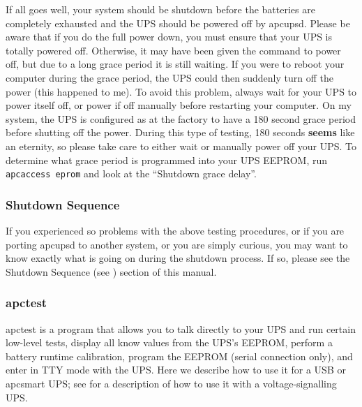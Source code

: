{{{{If all goes well, your system should be shutdown before the batteries are
completely exhausted and the UPS should be powered off by apcupsd. Please be
aware that if you do the full power down, you must ensure that your UPS is
totally powered off.  Otherwise, it may have been given the command to power
off, but due to a long grace period it is still waiting. If you were to reboot
your computer during the grace period, the UPS could then suddenly turn off
the power (this happened to me). To avoid this problem, always wait for your
UPS to power itself off, or power if off manually before restarting your
computer. On my system, the UPS is configured as at the factory to have a 180
second grace period before shutting off the power. During this type of
testing, 180 seconds {\bf seems} like an eternity, so please take care to
either wait or manually power off your UPS. To determine what grace period is
programmed into your UPS EEPROM, run {\tt apcaccess eprom} and look at the
``Shutdown grace delay''. 

\label{Shutdown-Sequence}

\subsubsection*{Shutdown Sequence}

\label{index-Shutdown-Sequence-99}
If you experienced so problems with the above testing procedures, or if you
are porting apcupsd to another system, or you are simply curious, you may want
to know exactly what is going on during the shutdown process. If so, please
see the Shutdown Sequence (see 
) section of this
manual. 

\label{apctest}

\subsubsection*{apctest}

\label{index-apctest-100}
apctest is a program that allows you to talk directly to your UPS and run
certain low-level tests, display all know values from the UPS's EEPROM,
perform a battery runtime calibration, program the EEPROM (serial connection
only), and enter in TTY mode with the UPS. Here we describe how to use it for
a USB or apcsmart UPS; see 
 for a description
of how to use it with a voltage-signalling UPS.  

}}}}
